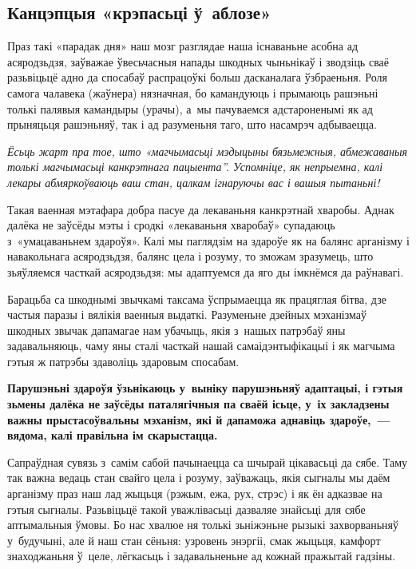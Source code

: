 \subsection*{Канцэпцыя «крэпасьці ў~аблозе»} 

Праз такі «парадак дня» наш мозг разглядае наша існаваньне асобна ад асяродзьдзя, заўважае ўвесьчасныя напады шкодных чыньнікаў і зводзіць сваё разьвіцьцё адно да спосабаў распрацоўкі больш дасканалага ўзбраеньня. Роля самога чалавека (жаўнера) нязначная, бо камандуюць і прымаюць рашэньні толькі палявыя камандыры (урачы), а~мы пачуваемся адстароненымі як ад прыняцьця рашэньняў, так і ад разуменьня таго, што насамрэч адбываецца. 

\emph{Ёсьць жарт пра тое, што «магчымасьці мэдыцыны бязьмежныя, абмежаваныя толькі магчымасьці канкрэтнага пацыента''. Успомніце, як непрыемна, калі лекары абмяркоўваюць ваш стан, цалкам ігнаруючы вас і вашыя пытаньні!}

Такая ваенная мэтафара добра пасуе да лекаваньня канкрэтнай хваробы. Аднак далёка не заўсёды мэты і сродкі «лекаваньня хваробаў» супадаюць з~«умацаваньнем здароўя». Калі мы паглядзім на здароўе як на балянс арганізму і навакольнага асяродзьдзя, балянс цела і розуму, то зможам зразумець, што зьяўляемся часткай асяродзьдзя: мы адаптуемся да яго ды імкнёмся да раўнавагі.

Барацьба са шкоднымі звычкамі таксама ўспрымаецца як працяглая бітва, дзе частыя паразы і вялікія ваенныя выдаткі. Разуменьне дзейных мэханізмаў шкодных звычак дапамагае нам убачыць, якія з~нашых патрэбаў яны задавальняюць, чаму яны сталі часткай нашай самаідэнтыфікацыі і як магчыма гэтыя ж патрэбы здаволіць здаровым спосабам.

\textbf{Парушэньні здароўя ўзьнікаюць у~выніку парушэньняў адаптацыі, і гэтыя зьмены далёка не заўсёды паталягічныя па сваёй ісьце, у~іх закладзены важны прыстасоўвальны мэханізм, які й дапаможа аднавіць здароўе,~--- вядома, калі правільна ім скарыстацца.} 

Сапраўдная сувязь з~самім сабой пачынаецца са шчырай цікавасьці да сябе. Таму так важна ведаць стан свайго цела і розуму, заўважаць, якія сыгналы мы даём арганізму праз наш лад жыцьця (рэжым, ежа, рух, стрэс) і як ён адказвае на гэтыя сыгналы. Разьвіцьцё такой уважлівасьці дазваляе знайсьці для сябе аптымальныя ўмовы. Бо нас хвалюе ня толькі зьніжэньне рызыкі захворваньняў у~будучыні, але й наш стан сёньня: узровень энэргіі, смак жыцьця, камфорт знаходжаньня ў~целе, лёгкасьць і задавальненьне ад кожнай пражытай гадзіны.


